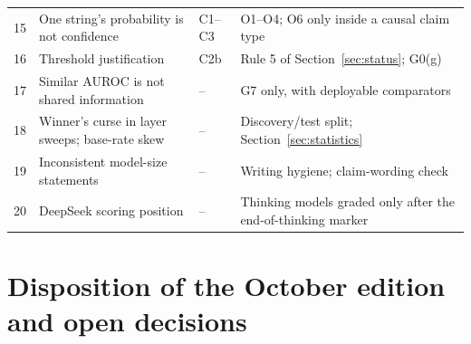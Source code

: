 \documentclass[10pt,a4paper]{article}
\begin{document}
\begin{center}
\begin{longtable}{@{}P{0.6cm}P{5.8cm}P{1.5cm}P{7.5cm}@{}}
15 & One string's probability is not confidence & C1--C3 & O1--O4; O6 only inside a causal claim type \\
16 & Threshold justification & C2b & Rule 5 of Section~\ref{sec:status}; G0(g) \\
17 & Similar AUROC is not shared information & -- & G7 only, with deployable comparators \\
18 & Winner's curse in layer sweeps; base-rate skew & -- & Discovery/test split; Section~\ref{sec:statistics} \\
19 & Inconsistent model-size statements & -- & Writing hygiene; claim-wording check \\
20 & DeepSeek scoring position & -- & Thinking models graded only after the end-of-thinking marker \\
\bottomrule
\end{longtable}
\end{center}

\section{Disposition of the October edition and open decisions}
\label{app:disposition}
\end{document}
